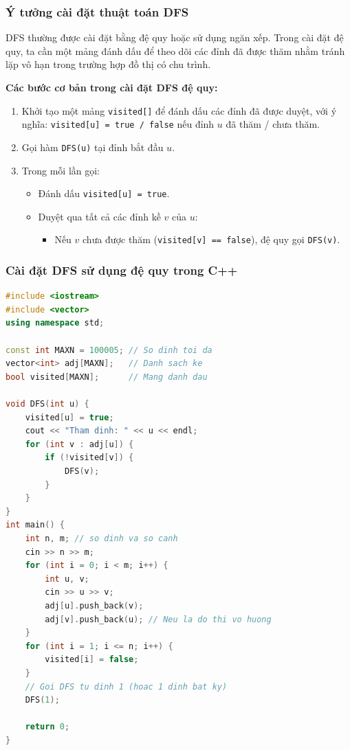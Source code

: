 \documentclass{article}
\begin{document}
\subsubsection{Ý tưởng cài đặt thuật toán DFS}

DFS thường được cài đặt bằng đệ quy hoặc sử dụng ngăn xếp. Trong cài đặt đệ quy, ta cần một mảng đánh dấu để theo dõi các đỉnh đã được thăm nhằm tránh lặp vô hạn trong trường hợp đồ thị có chu trình.

\textbf{Các bước cơ bản trong cài đặt DFS đệ quy:}

\begin{enumerate}
    \item Khởi tạo một mảng \texttt{visited[]} để đánh dấu các đỉnh đã được duyệt, với ý nghĩa: \texttt{visited[u] = true / false} nếu đỉnh $u$ đã thăm / chưa thăm.
    \item Gọi hàm \texttt{DFS(u)} tại đỉnh bắt đầu $u$.
    \item Trong mỗi lần gọi:
    \begin{itemize}
        \item Đánh dấu \texttt{visited[u] = true}.
        \item Duyệt qua tất cả các đỉnh kề $v$ của $u$:
        \begin{itemize}
            \item Nếu $v$ chưa được thăm (\texttt{visited[v] == false}), đệ quy gọi \texttt{DFS(v)}.
        \end{itemize}
    \end{itemize}
\end{enumerate}

\subsubsection{Cài đặt DFS sử dụng đệ quy trong C++}

\begin{lstlisting}[language=C++, caption={Thuật toán DFS sử dụng đệ quy}, label={code:dfs}]
#include <iostream>
#include <vector>
using namespace std;

const int MAXN = 100005; // So dinh toi da
vector<int> adj[MAXN];   // Danh sach ke
bool visited[MAXN];      // Mang danh dau

void DFS(int u) {
    visited[u] = true;
    cout << "Tham dinh: " << u << endl;
    for (int v : adj[u]) {
        if (!visited[v]) {
            DFS(v);
        }
    }
}
int main() {
    int n, m; // so dinh va so canh
    cin >> n >> m;
    for (int i = 0; i < m; i++) {
        int u, v;
        cin >> u >> v;
        adj[u].push_back(v);
        adj[v].push_back(u); // Neu la do thi vo huong
    }
    for (int i = 1; i <= n; i++) {
        visited[i] = false;
    }
    // Goi DFS tu dinh 1 (hoac 1 dinh bat ky)
    DFS(1);

    return 0;
}
\end{lstlisting}
\end{document}
